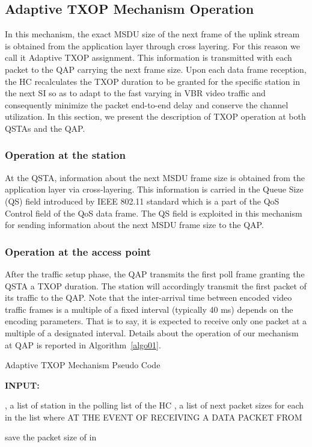 \documentclass[a4paper, conference]{IEEEtran}
\begin{document}
\subsection{Adaptive TXOP Mechanism Operation}
In this mechanism, the exact MSDU size of the next frame of the uplink stream is obtained from the application layer through cross layering. For this reason we call it Adaptive TXOP assignment. This information is transmitted with each packet to the QAP carrying the next frame size. Upon each data frame reception, the HC recalculates the TXOP duration to be granted for the specific station in the next SI so as to adapt to the fast varying in VBR video traffic and consequently minimize the packet end-to-end delay and conserve the channel utilization. In this section, we present the description of TXOP operation at both QSTAs and the QAP.
\subsubsection{Operation at the station}
At the QSTA, information about the next MSDU frame size is obtained from the application layer via cross-layering. This information is carried in the Queue  Size (QS) field introduced by IEEE 802.11 standard \cite{IEEEStandard2007} which is a part of the QoS Control field of the QoS data frame. The QS field is exploited in this mechanism for sending information about the next MSDU frame size to the QAP.
\subsubsection{Operation at the access point} 
After the traffic setup phase, the QAP transmits the first poll frame granting the QSTA a TXOP duration. The station will accordingly transmit the first packet of its traffic to the QAP. Note that the inter-arrival time between encoded video traffic frames is a multiple of a fixed interval (typically 40 ms) depends on the encoding parameters. That is to say, it is expected to receive only one packet at a multiple of a designated interval. Details about the operation of our mechanism at QAP is reported in Algorithm~\ref{algo01}.
\begin{algorithm}
\caption{Adaptive TXOP Mechanism Pseudo Code}\label{algo01}
\textbf{INPUT:}

, a list of  station in the polling list of the HC\;
, a list of next packet sizes for each  in the  list where \;
AT THE EVENT OF RECEIVING A DATA PACKET FROM 

save the packet size of  in 

\end{algorithm}\DecMargin{1em}
\end{document}
